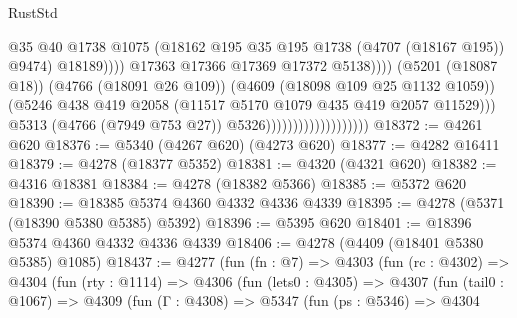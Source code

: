 \begin{lexlean}{RustStd}
\begin{coremodule}
                                                            @35
                                                            @40
                                                            @1738
                                                            @1075
                                                            (@18162
                                                              @195
                                                              @35
                                                              @195
                                                              @1738
                                                              (@4707 (@18167 @195))
                                                              @9474)
                                                            @18189))))
                                                    @17363
                                                    @17366
                                                    @17369
                                                    @17372
                                                    @5138))))
                                            (@5201 (@18087 @18))
                                            (@4766 (@18091 @26 @109))
                                            (@4609 (@18098 @109 @25 @1132 @1059))
                                            (@5246
                                              @438
                                              @419
                                              @2058
                                              (@11517 @5170 @1079 @435 @419 @2057 @11529)))
                                          @5313
                                          (@4766 (@7949 @753 @27))
                                          @5326)))))))))))))))))))
@18372 := @4261 @620
@18376 := @5340 (@4267 @620) (@4273 @620)
@18377 := @4282 @16411
@18379 := @4278 (@18377 @5352)
@18381 := @4320 (@4321 @620)
@18382 := @4316 @18381
@18384 := @4278 (@18382 @5366)
@18385 := @5372 @620
@18390 := @18385 @5374 @4360 @4332 @4336 @4339
@18395 := @4278 (@5371 (@18390 @5380 @5385) @5392)
@18396 := @5395 @620
@18401 := @18396 @5374 @4360 @4332 @4336 @4339
@18406 := @4278 (@4409 (@18401 @5380 @5385) @1085)
@18437 := @4277
    (fun (fn : @7) =>
    @4303
      (fun (rc : @4302) =>
      @4304
        (fun (rty : @1114) =>
        @4306
          (fun (lets0 : @4305) =>
          @4307
            (fun (tail0 : @1067) =>
            @4309
              (fun (Γ : @4308) =>
              @5347
                (fun (ps : @5346) =>
                @4304

\end{coremodule}
\end{lexlean}

